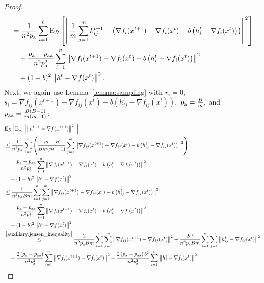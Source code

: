 \documentclass{article}
\newcommand*{\probavailable}{\ensuremath{p_{\textnormal{a}}}}
\newcommand*{\probpairaa}{\ensuremath{p_{\textnormal{aa}}}}
\begin{document}
\begin{proof}
\begin{align*}
    &= \frac{1}{n^2 \probavailable}\sum_{i=1}^n\ExpSub{B}{\norm{\frac{1}{m}\sum_{j=1}^m k^{t+1}_{ij} - \left(\nabla f_{i}(x^{t+1}) - \nabla f_{i}(x^{t}) - b \left(h^t_{i} - \nabla f_{i}(x^{t})\right)\right)}^2} \\
    &\quad +\frac{\probavailable - \probpairaa}{n^2 \probavailable^2}\sum_{i=1}^n\norm{\nabla f_{i}(x^{t+1}) - \nabla f_{i}(x^{t}) - b \left(h^t_{i} - \nabla f_{i}(x^{t})\right)}^2 \\
    &\quad + (1 - b)^2\norm{h^{t} - \nabla f(x^{t})}^2.
  \end{align*}
  Next, we again use Lemma~\ref{lemma:sampling} with $r_i = 0,$ $s_i = \nabla f_{ij}(x^{t+1}) - \nabla f_{ij}(x^{t}) - b \left(h^t_{ij} - \nabla f_{ij}(x^{t})\right), $ $\probavailable = \frac{B}{m},$ and $\probpairaa = \frac{B(B-1)}{m(m-1)}$:
  \begin{align*}
    &\ExpSub{B}{\ExpSub{\probavailable}{\norm{h^{t+1} - \nabla f(x^{t+1})}^2}} \\
    &\leq \frac{1}{n^2 \probavailable}\sum_{i=1}^n\left(\frac{m - B}{B m (m - 1)}\sum_{j=1}^m\norm{\nabla f_{ij}(x^{t+1}) - \nabla f_{ij}(x^{t}) - b \left(h^t_{ij} - \nabla f_{ij}(x^{t})\right)}^2\right) \\
    &\quad +\frac{\probavailable - \probpairaa}{n^2 \probavailable^2}\sum_{i=1}^n\norm{\nabla f_{i}(x^{t+1}) - \nabla f_{i}(x^{t}) - b \left(h^t_{i} - \nabla f_{i}(x^{t})\right)}^2 \\
    &\quad + (1 - b)^2\norm{h^{t} - \nabla f(x^{t})}^2\\
    &\leq \frac{1}{n^2 \probavailable B m}\sum_{i=1}^n\sum_{j=1}^m\norm{\nabla f_{ij}(x^{t+1}) - \nabla f_{ij}(x^{t}) - b \left(h^t_{ij} - \nabla f_{ij}(x^{t})\right)}^2 \\
    &\quad +\frac{\probavailable - \probpairaa}{n^2 \probavailable^2}\sum_{i=1}^n\norm{\nabla f_{i}(x^{t+1}) - \nabla f_{i}(x^{t}) - b \left(h^t_{i} - \nabla f_{i}(x^{t})\right)}^2 \\
    &\quad + (1 - b)^2\norm{h^{t} - \nabla f(x^{t})}^2\\
    &\overset{\eqref{auxiliary:jensen_inequality}}{\leq} \frac{2}{n^2 \probavailable B m}\sum_{i=1}^n\sum_{j=1}^m\norm{\nabla f_{ij}(x^{t+1}) - \nabla f_{ij}(x^{t})}^2 + \frac{2b^2}{n^2 \probavailable B m}\sum_{i=1}^n\sum_{j=1}^m\norm{h^t_{ij} - \nabla f_{ij}(x^{t})}^2 \\
    &\quad +\frac{2 \left(\probavailable - \probpairaa\right)}{n^2 \probavailable^2}\sum_{i=1}^n\norm{\nabla f_{i}(x^{t+1}) - \nabla f_{i}(x^{t})}^2 + \frac{2\left(\probavailable - \probpairaa\right)b^2}{n^2 \probavailable^2}\sum_{i=1}^n\norm{h^t_{i} - \nabla f_{i}(x^{t})}^2 \\

\end{align*}
\end{proof}
\end{document}
